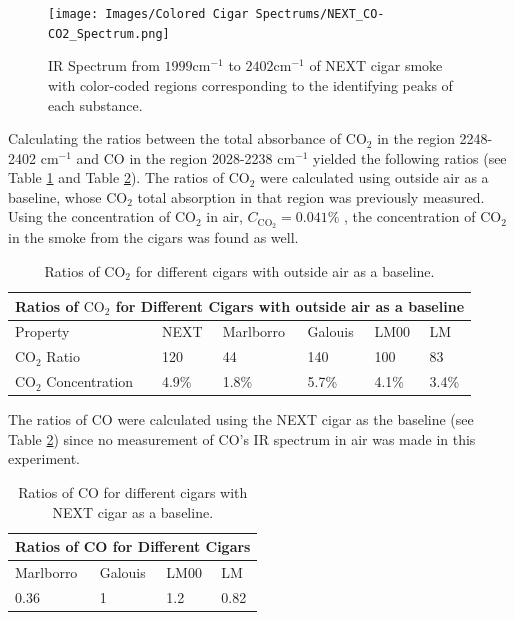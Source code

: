 \documentclass[reprint,amsmath,amssymb,aps, prl]{revtex4-2}
\begin{document}
\begin{figure}
    \texttt{[image: Images/Colored Cigar Spectrums/NEXT\_CO-CO2\_Spectrum.png]} 
    \caption{IR Spectrum from $1999 \text{cm}^{-1}$ to $2402 \text{cm}^{-1}$ of NEXT cigar smoke with color-coded regions corresponding to the identifying peaks of each substance.}
    \label{fig:COCO2NEXT}
\end{figure}

Calculating the ratios between the total absorbance of $\text{CO}_{2}$ in the region 2248-2402 $\text{cm}^{-1}$ and CO in the region 2028-2238 $\text{cm}^{-1}$ yielded the following ratios (see Table \ref{tbl:CigarCO2RATIOS} and Table \ref{tbl:CigarCORATIOS}). The ratios of $\text{CO}_{2}$ were calculated using outside air as a baseline, whose $\text{CO}_{2}$ total absorption in that region was previously measured. Using the concentration of $\text{CO}_{2}$ in air, $C_{\text{CO}_{2}}=0.041\%$ \cite{NASA}, the concentration of $\text{CO}_{2}$ in the smoke from the cigars was found as well. 

\begin{table}[h]
    \begin{tabular}{ |p{1.9cm}|p{1.3cm}|p{1.5cm}|p{1.5cm}|p{1cm}|p{1cm}|  }
     \hline
     \multicolumn{6}{|c|}{Ratios of $\text{CO}_{2}$ for Different Cigars with outside air as a baseline} \\ \hline
     Property & NEXT & Marlborro & Galouis & LM00 & LM\\ \hline
     $\text{CO}_{2}$ Ratio & 120 & 44 & 140 & 100 & 83 \\ \hline
     $\text{CO}_{2}$ Concentration &4.9\% & 1.8\%& 5.7\% & 4.1\% & 3.4\% \\\hline
    
    \end{tabular}
    \caption{Ratios of $\text{CO}_{2}$ for different cigars with outside air as a baseline.}
    \label{tbl:CigarCO2RATIOS}
\end{table}

The ratios of CO were calculated using the NEXT cigar as the baseline (see Table \ref{tbl:CigarCORATIOS}) since no measurement of CO's IR spectrum in air was made in this experiment.

\begin{table}[h]
    \begin{tabular}{ |p{1.5cm}|p{1.5cm}|p{1.5cm}|p{1cm}|  }
     \hline
     \multicolumn{4}{|c|}{Ratios of CO for Different Cigars} \\ \hline
      Marlborro & Galouis & LM00 & LM\\ \hline
       0.36 & 1 & 1.2 & 0.82 \\ \hline
    \end{tabular}
    \caption{Ratios of CO for different cigars with NEXT cigar as a baseline.}
    \label{tbl:CigarCORATIOS}
\end{table}
\end{document}
